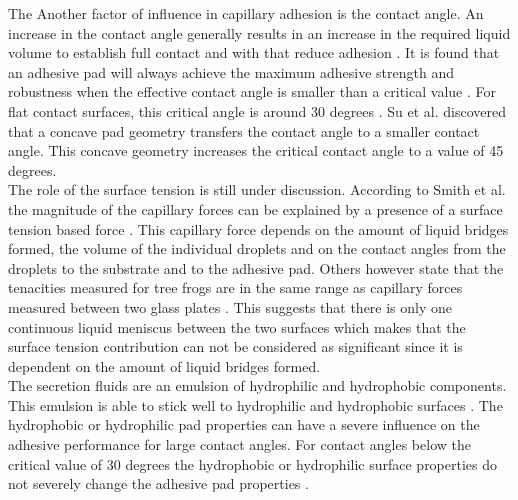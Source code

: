 \qquad The Another factor of influence in capillary adhesion is the contact angle. An increase in the contact angle generally results in an increase in the required liquid volume to establish full contact and with that reduce adhesion \cite{qian2006scaling}. It is found that an adhesive pad will always achieve the maximum adhesive strength and robustness when the effective contact angle is smaller than a critical value \cite{su2009concave}. For flat contact surfaces, this critical angle is around 30 degrees \cite{orchard2012influence}. Su et al. discovered that a concave pad geometry transfers the contact angle to a smaller contact angle. This concave geometry increases the critical contact angle to a value of 45 degrees.\\

\qquad The role of the surface tension is still under discussion. According to Smith et al.  \cite{smith2006adhesion} the magnitude of the capillary forces can be explained by a presence of a surface tension based force \cite{peng2016microstructure}.  This capillary force depends on the amount of liquid bridges formed, the volume of the individual droplets and on the contact angles from the droplets to the substrate and to the adhesive pad. Others however state that the tenacities measured for tree frogs are in the same range as capillary forces measured between two glass plates \cite{langowski2018tree}. This suggests that there is only one continuous liquid meniscus between the two surfaces \cite{scholz2009ultrastructure} which makes that the surface tension contribution can not be considered as significant since it is dependent on the amount of liquid bridges formed.\\

\qquad The secretion fluids are an emulsion of hydrophilic and hydrophobic components. This emulsion is able to stick well to hydrophilic and hydrophobic surfaces \cite{langowski2018tree}. The hydrophobic or hydrophilic pad properties can have a severe influence on the adhesive performance for large contact angles. For contact angles below the critical value of 30 degrees the hydrophobic or hydrophilic surface properties do not severely change the adhesive pad properties \cite{orchard2012influence}.\\

